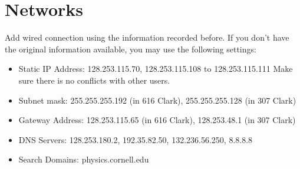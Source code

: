 \documentclass[12pt]{article}
\begin{document}
\section{Networks}
Add wired connection using the information recorded before. If you don't have the original information available, you may use the following settings:
\begin{itemize}


\item Static IP Address: 128.253.115.70, 128.253.115.108 to 128.253.115.111
Make sure there is no conflicts with other users.
\item Subnet mask: 255.255.255.192 (in 616 Clark), 255.255.255.128 (in 307 Clark)
\item Gateway Address: 128.253.115.65 (in 616 Clark), 128.253.48.1 (in 307 Clark)
\item DNS Servers: 128.253.180.2, 192.35.82.50, 132.236.56.250, 8.8.8.8
\item Search Domains: physics.cornell.edu
\end{itemize}
\end{document}

